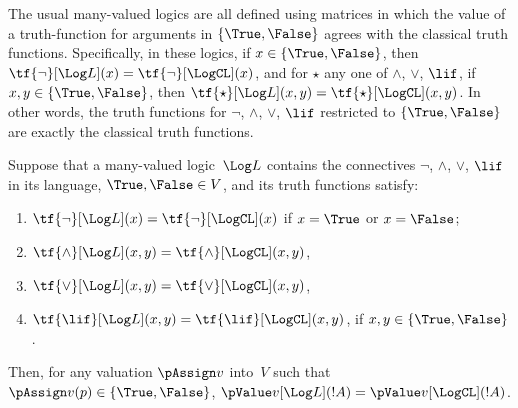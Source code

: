 \documentclass[../../../include/open-logic-section]{subfiles}
\begin{document}


The usual many-valued logics are all defined using matrices in which
the value of a truth-function for arguments in $\{\True, \False\}$
agrees with the classical truth functions. Specifically, in these
logics, if $x \in \{\True, \False\}$, then $\tf{\lnot}[\Log L](x) =
\tf{\lnot}[\LogCL](x)$, and for $\star$ any one of $\land$, $\lor$,
$\lif$, if $x, y \in \{\True, \False\}$, then $\tf{\star}[\Log L](x,y) =
\tf{\star}[\LogCL](x,y)$. In other words, the truth functions for
$\lnot$, $\land$, $\lor$, $\lif$ restricted to $\{\True,\False\}$ are
exactly the classical truth functions.

\begin{prop}
  Suppose that a many-valued logic~$\Log L$ contains the connectives
  $\lnot$, $\land$, $\lor$, $\lif$ in its language, $\True, \False \in
  V$, and its truth
  functions satisfy:
  \begin{enumerate}
    \item{} $\tf{\lnot}[\Log L](x) = \tf{\lnot}[\LogCL](x)$ if $x =
    \True$ or $x = \False$;
    \item{} $\tf{\land}[\Log L](x,y) = \tf{\land}[\LogCL](x,y)$,
    \item{} $\tf{\lor}[\Log L](x,y) = \tf{\lor}[\LogCL](x,y)$,
    \item{} $\tf{\lif}[\Log L](x,y) = \tf{\lif}[\LogCL](x,y)$,
    if $x, y \in \{\True, \False\}$.
  \end{enumerate}
  Then, for any valuation $\pAssign v$ into~$V$ such that $\pAssign
  v(p) \in \{\True,\False\}$, $\pValue v[\Log L](!A) = \pValue
  v[\LogCL](!A)$.
\end{prop}
\end{document}

